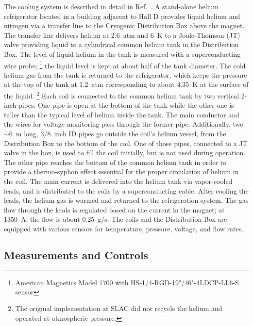The cooling system is described in detail in Ref.~\cite{Lavendure:2014:refrig}.
A stand-alone helium refrigerator located
in a building adjacent to Hall D provides liquid helium and nitrogen
via a transfer line to the Cryogenic Distribution Box above the
magnet. The transfer line delivers helium at 2.6~atm and 6~K to a Joule-Thomson
(JT) valve providing liquid to a cylindrical common helium tank in the
Distribution Box. The level of liquid helium in the tank is measured
with a superconducting wire probe;%
\footnote{
  American Magnetics Model 1700 with HS-1/4-RGD-19"/46"-4LDCP-LL6-S sensor
}
 the liquid level is kept at about half of the tank diameter. The cold helium gas
 from the tank is returned to the refrigerator, which keeps the
 pressure at the top of the tank at 1.2~atm corresponding to about
 4.35~K at the surface of the liquid.%
\footnote{
  The original implementation at SLAC did not recycle the helium and
  operated at atmospheric pressure.
}
Each coil is connected to the common helium tank by two vertical 2-inch
pipes.  One pipe is open at the bottom of the tank while the other one
is taller than the typical level of helium inside the tank. The main
conductor and the wires for voltage monitoring pass through the former
pipe. Additionally, two $\sim$6~m long, 3/8~inch ID pipes go outside
the coil's helium vessel, from the Distribution Box to the bottom of
the coil. One of those pipes, connected to a JT valve in the box, is used to fill the coil initially, but is not used during operation.
The other pipe reaches the bottom of
the common helium tank in order to provide 
a thermo-syphon effect essential
for the proper circulation of helium in the coil. The main current is
delivered into the helium tank via vapor-cooled leads, and is
distributed to the coils by a superconducting cable. After cooling the
leads, the helium gas is warmed and returned to the refrigeration
system. The gas flow through the leads is regulated based on the
current in the magnet; at 1350~A, the flow is about 0.25~g/s. The
coils and the Distribution Box are equipped with various sensors for
temperature, pressure, voltage, and flow rates.

\subsection[Measurements and Controls]{
         Measurements and Controls
        \label{sec:sol:controls}
}

